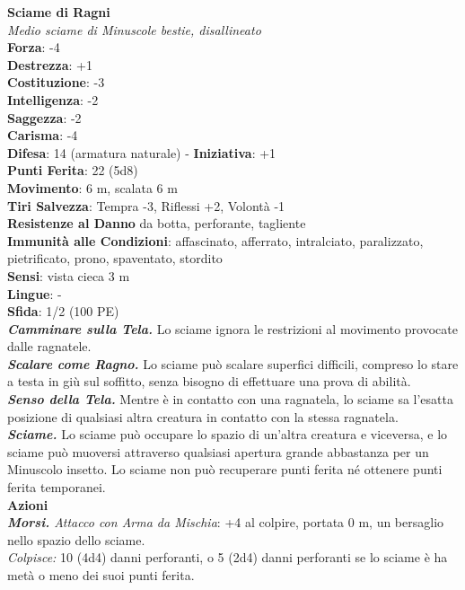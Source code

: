 \begin{multicols}{2}
\medskip\textbf{Sciame di Ragni}\\
\emph{Medio sciame di Minuscole bestie, disallineato}\\
\textbf{Forza}: -4\\
\textbf{Destrezza}: +1\\
\textbf{Costituzione}: -3\\
\textbf{Intelligenza}: -2\\
\textbf{Saggezza}: -2\\
\textbf{Carisma}: -4\\
\textbf{Difesa}: 14 (armatura naturale) - \textbf{Iniziativa}: +1\\
\textbf{Punti Ferita}: 22 (5d8)\\
\textbf{Movimento}: 6 m, scalata 6 m\\
\textbf{Tiri Salvezza}: Tempra -3, Riflessi +2, Volontà -1\\
\textbf{Resistenze al Danno} da botta, perforante, tagliente\\
\textbf{Immunità alle Condizioni}: affascinato, afferrato, intralciato, paralizzato, pietrificato, prono, spaventato, stordito\\
\textbf{Sensi}: vista cieca 3 m\\
\textbf{Lingue}: -\\
\textbf{Sfida}: 1/2 (100 PE)\smallskip\\
\emph{\textbf{Camminare sulla Tela.}} Lo sciame ignora le restrizioni al movimento provocate dalle ragnatele.\\
\emph{\textbf{Scalare come Ragno.}} Lo sciame può scalare superfici difficili, compreso lo stare a testa in giù sul soffitto, senza bisogno di effettuare una prova di abilità.\\
\emph{\textbf{Senso della Tela.}} Mentre è in contatto con una ragnatela, lo sciame sa l'esatta posizione di qualsiasi altra creatura in contatto con la stessa ragnatela.\\
\emph{\textbf{Sciame.}} Lo sciame può occupare lo spazio di un'altra creatura e viceversa, e lo sciame può muoversi attraverso qualsiasi apertura grande abbastanza per un Minuscolo insetto. Lo sciame non può recuperare punti ferita né ottenere punti ferita temporanei.\\
\smallskip\textbf{Azioni}\\
\emph{\textbf{Morsi.} Attacco con Arma da Mischia}: +4 al colpire, portata 0 m, un bersaglio nello spazio dello sciame.\\
\emph{Colpisce:} 10 (4d4) danni perforanti, o 5 (2d4) danni perforanti se lo sciame è ha metà o meno dei suoi punti ferita.\\


\end{multicols}
